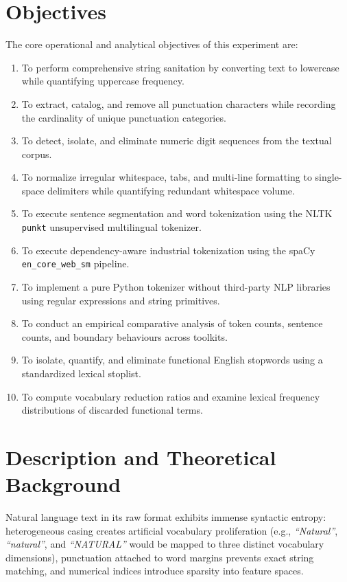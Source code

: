 \documentclass[12pt,a4paper]{report}
\begin{document}
\section{Objectives}
The core operational and analytical objectives of this experiment are:
\begin{enumerate}[label=\textbf{\arabic*.}]
    \item To perform comprehensive string sanitation by converting text to lowercase while quantifying uppercase frequency.
    \item To extract, catalog, and remove all punctuation characters while recording the cardinality of unique punctuation categories.
    \item To detect, isolate, and eliminate numeric digit sequences from the textual corpus.
    \item To normalize irregular whitespace, tabs, and multi-line formatting to single-space delimiters while quantifying redundant whitespace volume.
    \item To execute sentence segmentation and word tokenization using the NLTK \texttt{punkt} unsupervised multilingual tokenizer.
    \item To execute dependency-aware industrial tokenization using the spaCy \texttt{en\_core\_web\_sm} pipeline.
    \item To implement a pure Python tokenizer without third-party NLP libraries using regular expressions and string primitives.
    \item To conduct an empirical comparative analysis of token counts, sentence counts, and boundary behaviours across toolkits.
    \item To isolate, quantify, and eliminate functional English stopwords using a standardized lexical stoplist.
    \item To compute vocabulary reduction ratios and examine lexical frequency distributions of discarded functional terms.
\end{enumerate}

\section{Description and Theoretical Background}
Natural language text in its raw format exhibits immense syntactic entropy: heterogeneous casing creates artificial vocabulary proliferation (e.g., \textit{``Natural''}, \textit{``natural''}, and \textit{``NATURAL''} would be mapped to three distinct vocabulary dimensions), punctuation attached to word margins prevents exact string matching, and numerical indices introduce sparsity into feature spaces.
\end{document}

